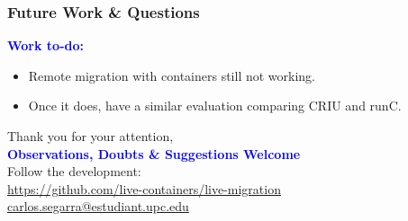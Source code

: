 \documentclass[9pt,    %
    english,            %
    xcolor=table,       %
    envcountsect,        %
    aspectratio=169     %
]{beamer}
\begin{document}
\begin{frame}
    \frametitle{Future Work \& Questions}

    \textbf{\textcolor{blue}{Work to-do:}}
    \begin{itemize}
        \item Remote migration with containers still not working.
        \item Once it does, have a similar evaluation comparing CRIU and runC.
    \end{itemize}

    \vspace{15pt}

    \begin{center}
        Thank you for your attention,\\[5pt]

        \Large
        \textbf{\textcolor{blue}{Observations, Doubts \& Suggestions Welcome}}\\[25pt]

        \normalsize
        Follow the development:\\ \url{https://github.com/live-containers/live-migration}\\[15pt]
        \url{carlos.segarra@estudiant.upc.edu}
    \end{center}
\end{frame}
\end{document}
